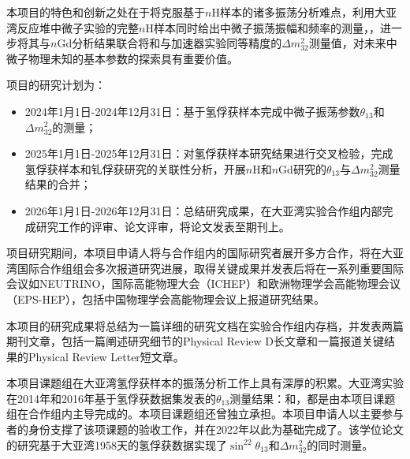 \documentclass[a4paper,zihao=-4]{article}
\begin{document}

本项目的特色和创新之处在于将克服基于$n$H样本的诸多振荡分析难点，利用大亚湾反应堆中微子实验的完整$n$H样本同时给出中微子振荡振幅和频率的测量，，进一步将其与$n$Gd分析结果联合将和与加速器实验同等精度的$\Delta m_{32}^2$测量值，对未来中微子物理未知的基本参数的探索具有重要价值。


项目的研究计划为：
\begin{itemize}
	\item 2024年1月1日-2024年12月31日：基于氢俘获样本完成中微子振荡参数$\theta_{13}$和$\Delta m_{32}^2$的测量；
	\item 2025年1月1日-2025年12月31日：对氢俘获样本研究结果进行交叉检验，完成氢俘获样本和钆俘获研究的关联性分析，开展$n$H和$n$Gd研究的$\theta_{13}$与$\Delta m_{32}^2$测量结果的合并；
	\item 2026年1月1日-2026年12月31日：总结研究成果，在大亚湾实验合作组内部完成研究工作的评审、论文评审，将论文发表至期刊上。
\end{itemize}

项目研究期间，本项目申请人将与合作组内的国际研究者展开多方合作，将在大亚湾国际合作组组会多次报道研究进展，取得关键成果并发表后将在一系列重要国际会议如NEUTRINO，国际高能物理大会（ICHEP）和欧洲物理学会高能物理会议（EPS-HEP），包括中国物理学会高能物理会议上报道研究结果。

本项目的研究成果将总结为一篇详细的研究文档在实验合作组内存档，并发表两篇期刊文章，包括一篇阐述研究细节的Physical Review D长文章和一篇报道关键结果的Physical Review Letter短文章。



本项目课题组在大亚湾氢俘获样本的振荡分析工作上具有深厚的积累。大亚湾实验在2014年和2016年基于氢俘获数据集发表的$\theta_{13}$测量结果：和，都是由本项目课题组在合作组内主导完成的。本项目课题组还曾独立承担。本项目申请人以主要参与者的身份支撑了该项课题的验收工作，并在2022年以此为基础完成了。该学位论文的研究基于大亚湾1958天的氢俘获数据实现了$\sin^22\theta_{13}$和$\Delta m_{32}^2$的同时测量。 
\end{document}
